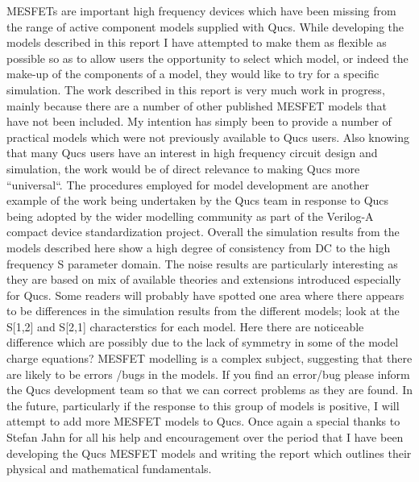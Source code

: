 
MESFETs are important high frequency devices which have been missing
from the range of active component models supplied with Qucs.  While
developing the models described in this report I have attempted to
make them as flexible as possible so as to allow users the opportunity
to select which model, or indeed the make-up of the components of a
model, they would like to try for a specific simulation.  The work
described in this report is very much work in progress, mainly because
there are a number of other published MESFET models that have not been
included.  My intention has simply been to provide a number of
practical models which were not previously available to Qucs users.
Also knowing that many Qucs users have an interest in high frequency
circuit design and simulation, the work would be of direct relevance
to making Qucs more ``universal``. The procedures employed for model
development are another example of the work being undertaken by the
Qucs team in response to Qucs being adopted by the wider modelling
community as part of the Verilog-A compact device standardization
project. Overall the simulation results from the models described here
show a high degree of consistency from DC to the high frequency S
parameter domain. The noise results are particularly interesting as
they are based on mix of available theories and extensions introduced
especially for Qucs.  Some readers will probably have spotted one area
where there appears to be differences in the simulation results from
the different models; look at the S[1,2] and S[2,1] characterstics for
each model.  Here there are noticeable difference which are possibly
due to the lack of symmetry in some of the model charge equations?
MESFET modelling is a complex subject, suggesting that there are
likely to be errors /bugs in the models.  If you find an error/bug
please inform the Qucs development team so that we can correct
problems as they are found. In the future, particularly if the
response to this group of models is positive, I will attempt to add
more MESFET models to Qucs. Once again a special thanks to Stefan Jahn
for all his help and encouragement over the period that I have been
developing the Qucs MESFET models and writing the report which
outlines their physical and mathematical fundamentals.
